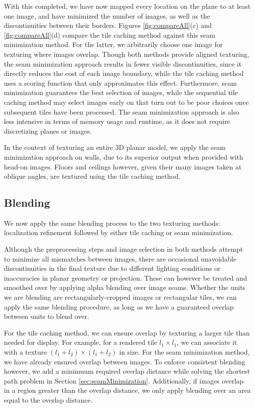 \documentclass[10pt,twocolumn,letterpaper]{article}
\begin{document}
With this completed, we have now mapped every location on the plane to
at least one image, and have minimized the number of images, as well
as the discontinuities between their borders. Figures \ref{fig:compareAll}(c) and
\ref{fig:compareAll}(d) compare the tile caching method against this
seam minimization method. For the latter, we arbitrarily choose one image for texturing where images overlap. Though both methods provide aligned texturing, the seam minimization approach results in fewer
visible discontinuities, since it directly reduces the cost of each
image boundary, while the tile caching method uses a scoring function
that only approximates this effect. Furthermore, seam minimization
guarantees the best selection of images, while the sequential tile
caching method may select images early on that turn out to be poor
choices once subsequent tiles have been processed. The seam
minimization approach is also less intensive in terms of memory usage
and runtime, as it does not require discretizing planes or images.

In the context of texturing an entire 3D planar model, we apply the seam
minimization approach on walls, due to its superior output when
provided with head-on images. Floors and ceilings however, given their
many images taken at oblique angles, are textured using the tile caching method.

\subsection{Blending}
\label{sec:blending}
We now apply the same blending process to the two texturing methods:
localization refinement followed by either tile caching or seam
minimization.

Although the preprocessing steps and image selection in both methods
attempt to minimize all mismatches between images, there are occasional
unavoidable discontinuities in the final texture due to different
lighting conditions or inaccuracies in planar geometry or
projection. These can however be treated and smoothed over by applying
alpha blending over image seams.  Whether the units we are blending
are rectangularly-cropped images or rectangular tiles, we can apply
the same blending procedure, as long as we have a guaranteed overlap
between units to blend over.

For the tile caching method, we can ensure overlap by texturing a
larger tile than needed for display. For example, for a rendered tile
$l_1 \times l_1$, we can associate it with a texture $(l_1 + l_2)
\times (l_1 + l_2)$ in size. For the seam minimization method, we have
already ensured overlap between images. To enforce consistent blending
however, we add a minimuum required overlap distance while solving the
shortest path problem in Section
\ref{sec:seamMinimization}. Additionally, if images overlap in a region
greater than the overlap distance, we only apply blending over an area
equal to the overlap distance.
\end{document}

